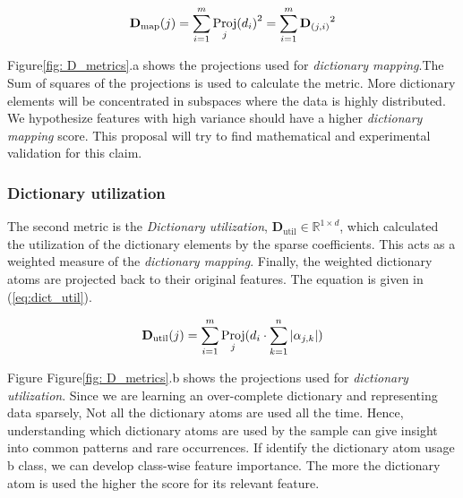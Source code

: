 \begin{equation}
    \label{eq:dict_map}
    \mathbf{D}_\textrm{map}(j)= \sum_{i=1}^m {\operatorname*{Proj}_j(d_i)}^2  = \sum_{i=1}^m {\mathbf{D}_{(j,i)}}^2 
\end{equation}

Figure\ref{fig: D_metrics}.a shows the projections used for \emph{dictionary mapping}.The Sum of squares of the projections is used to calculate the metric. More dictionary elements will be concentrated in subspaces where the data is highly distributed. We hypothesize features with high variance should have a higher \emph{dictionary mapping} score. This proposal will try to find mathematical and experimental validation for this claim.

\subsubsection{Dictionary utilization}
 The second metric is the \emph{Dictionary utilization}, $\mathbf{D}_\textrm{util} \in \mathbb{R}^{1 \times d}$, which calculated the utilization of the dictionary elements by the sparse coefficients. This acts as a weighted measure of the \emph{dictionary mapping}. Finally, the weighted dictionary atoms are projected back to their original features. The equation is given in (\ref{eq:dict_util}).

 
 \begin{equation}
    \label{eq:dict_util}
    \mathbf{D}_\textrm{util}(j)= \sum_{i=1}^m \operatorname*{Proj}_j(d_i \cdot \sum_{k=1}^n |\alpha_{j,k}|)  
\end{equation}

Figure Figure\ref{fig: D_metrics}.b shows the projections used for \emph{dictionary utilization}. Since we are learning an over-complete dictionary and representing data sparsely, Not all the dictionary atoms are used all the time. Hence, understanding which dictionary atoms are used by the sample can give insight into common patterns and rare occurrences. If identify the dictionary atom usage b class, we can develop class-wise feature importance. The more the dictionary atom is used the higher the score for its relevant feature.


